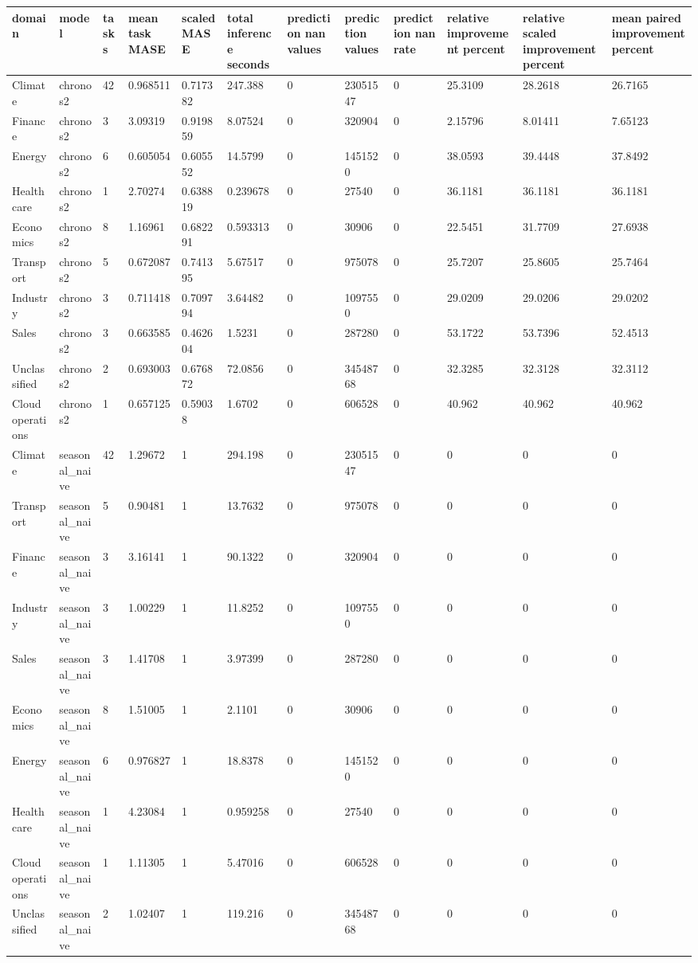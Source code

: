 \begin{tabular}{llllllllllll}
\toprule
domain & model & tasks & mean task MASE & scaled MASE & total inference seconds & prediction nan values & prediction values & prediction nan rate & relative improvement percent & relative scaled improvement percent & mean paired improvement percent \\
\midrule
Climate & chronos2 & 42 & 0.968511 & 0.717382 & 247.388 & 0 & 23051547 & 0 & 25.3109 & 28.2618 & 26.7165 \\
Finance & chronos2 & 3 & 3.09319 & 0.919859 & 8.07524 & 0 & 320904 & 0 & 2.15796 & 8.01411 & 7.65123 \\
Energy & chronos2 & 6 & 0.605054 & 0.605552 & 14.5799 & 0 & 1451520 & 0 & 38.0593 & 39.4448 & 37.8492 \\
Healthcare & chronos2 & 1 & 2.70274 & 0.638819 & 0.239678 & 0 & 27540 & 0 & 36.1181 & 36.1181 & 36.1181 \\
Economics & chronos2 & 8 & 1.16961 & 0.682291 & 0.593313 & 0 & 30906 & 0 & 22.5451 & 31.7709 & 27.6938 \\
Transport & chronos2 & 5 & 0.672087 & 0.741395 & 5.67517 & 0 & 975078 & 0 & 25.7207 & 25.8605 & 25.7464 \\
Industry & chronos2 & 3 & 0.711418 & 0.709794 & 3.64482 & 0 & 1097550 & 0 & 29.0209 & 29.0206 & 29.0202 \\
Sales & chronos2 & 3 & 0.663585 & 0.462604 & 1.5231 & 0 & 287280 & 0 & 53.1722 & 53.7396 & 52.4513 \\
Unclassified & chronos2 & 2 & 0.693003 & 0.676872 & 72.0856 & 0 & 34548768 & 0 & 32.3285 & 32.3128 & 32.3112 \\
Cloud operations & chronos2 & 1 & 0.657125 & 0.59038 & 1.6702 & 0 & 606528 & 0 & 40.962 & 40.962 & 40.962 \\
Climate & seasonal\_naive & 42 & 1.29672 & 1 & 294.198 & 0 & 23051547 & 0 & 0 & 0 & 0 \\
Transport & seasonal\_naive & 5 & 0.90481 & 1 & 13.7632 & 0 & 975078 & 0 & 0 & 0 & 0 \\
Finance & seasonal\_naive & 3 & 3.16141 & 1 & 90.1322 & 0 & 320904 & 0 & 0 & 0 & 0 \\
Industry & seasonal\_naive & 3 & 1.00229 & 1 & 11.8252 & 0 & 1097550 & 0 & 0 & 0 & 0 \\
Sales & seasonal\_naive & 3 & 1.41708 & 1 & 3.97399 & 0 & 287280 & 0 & 0 & 0 & 0 \\
Economics & seasonal\_naive & 8 & 1.51005 & 1 & 2.1101 & 0 & 30906 & 0 & 0 & 0 & 0 \\
Energy & seasonal\_naive & 6 & 0.976827 & 1 & 18.8378 & 0 & 1451520 & 0 & 0 & 0 & 0 \\
Healthcare & seasonal\_naive & 1 & 4.23084 & 1 & 0.959258 & 0 & 27540 & 0 & 0 & 0 & 0 \\
Cloud operations & seasonal\_naive & 1 & 1.11305 & 1 & 5.47016 & 0 & 606528 & 0 & 0 & 0 & 0 \\
Unclassified & seasonal\_naive & 2 & 1.02407 & 1 & 119.216 & 0 & 34548768 & 0 & 0 & 0 & 0 \\
\bottomrule
\end{tabular}
